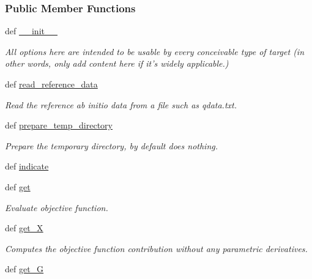 \subsubsection*{\-Public \-Member \-Functions}
\begin{DoxyCompactItemize}
\item 
def \hyperlink{classforcebalance_1_1interaction_1_1Interaction_a114db2e8c51f0fb73501fcb538bf76ec}{\-\_\-\-\_\-init\-\_\-\-\_\-}
\begin{DoxyCompactList}\small\item\em \-All options here are intended to be usable by every conceivable type of target (in other words, only add content here if it's widely applicable.) \end{DoxyCompactList}\item 
def \hyperlink{classforcebalance_1_1interaction_1_1Interaction_aa67c082c3b6fa2d87ba3f4cf1a74e4f8}{read\-\_\-reference\-\_\-data}
\begin{DoxyCompactList}\small\item\em \-Read the reference ab initio data from a file such as qdata.\-txt. \end{DoxyCompactList}\item 
def \hyperlink{classforcebalance_1_1interaction_1_1Interaction_a7b5dea70b67d3b2c0449a7cea8b12bf4}{prepare\-\_\-temp\-\_\-directory}
\begin{DoxyCompactList}\small\item\em \-Prepare the temporary directory, by default does nothing. \end{DoxyCompactList}\item 
def \hyperlink{classforcebalance_1_1interaction_1_1Interaction_a91f94b978b73dd886035dcdb96b53cc1}{indicate}
\item 
def \hyperlink{classforcebalance_1_1interaction_1_1Interaction_a9fc3a40eb2852241ea440af719f6cf29}{get}
\begin{DoxyCompactList}\small\item\em \-Evaluate objective function. \end{DoxyCompactList}\item 
def \hyperlink{classforcebalance_1_1target_1_1Target_a606dd136f195c267c05a2455405e5949}{get\-\_\-\-X}
\begin{DoxyCompactList}\small\item\em \-Computes the objective function contribution without any parametric derivatives. \end{DoxyCompactList}\item 
def \hyperlink{classforcebalance_1_1target_1_1Target_afa8cc38c8bba8861c072e789717aa049}{get\-\_\-\-G}

\end{DoxyCompactItemize}
